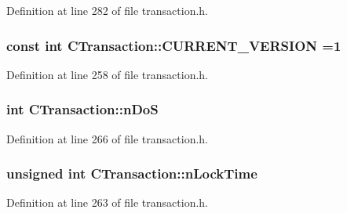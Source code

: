 Definition at line 282 of file transaction.\+h.

\hypertarget{class_c_transaction_aa728c112d5cdd174ee156a67107f1cf4}{}
\subsubsection[{C\+U\+R\+R\+E\+N\+T\+\_\+\+V\+E\+R\+S\+I\+O\+N}]{\setlength{\rightskip}{0pt plus 5cm}const int C\+Transaction\+::\+C\+U\+R\+R\+E\+N\+T\+\_\+\+V\+E\+R\+S\+I\+O\+N =1\hspace{0.3cm}{\ttfamily [static]}}\label{class_c_transaction_aa728c112d5cdd174ee156a67107f1cf4}


Definition at line 258 of file transaction.\+h.

\hypertarget{class_c_transaction_a2a1fd6929add85d3df299249da78d015}{}
\subsubsection[{n\+Do\+S}]{\setlength{\rightskip}{0pt plus 5cm}int C\+Transaction\+::n\+Do\+S\hspace{0.3cm}{\ttfamily [mutable]}}\label{class_c_transaction_a2a1fd6929add85d3df299249da78d015}


Definition at line 266 of file transaction.\+h.

\hypertarget{class_c_transaction_ab01e4e451d2f3f84b01380979c8fdacc}{}
\subsubsection[{n\+Lock\+Time}]{\setlength{\rightskip}{0pt plus 5cm}unsigned int C\+Transaction\+::n\+Lock\+Time}\label{class_c_transaction_ab01e4e451d2f3f84b01380979c8fdacc}


Definition at line 263 of file transaction.\+h.

\hypertarget{class_c_transaction_a8ccb4b6020669bc562095e3417715e41}{}
